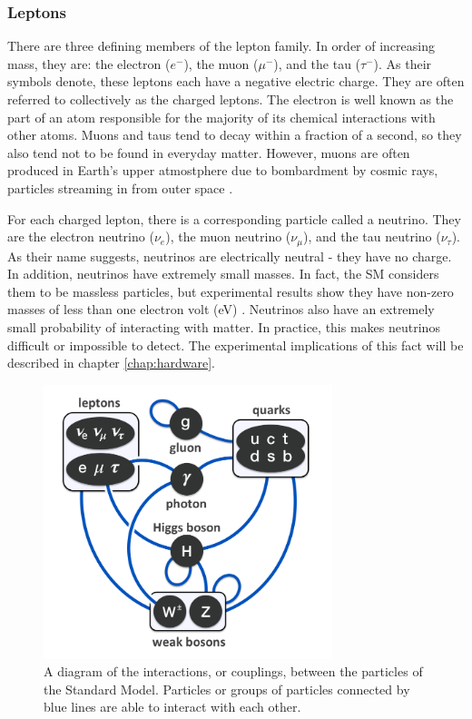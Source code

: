 \subsubsection*{Leptons}
There are three defining members of the lepton family. In order of
increasing mass, they are: the electron
($e^-$), the muon ($\mu^-$), and the tau ($\tau^-$). As their symbols
denote, these leptons each have a negative electric charge. They are
often referred to collectively as the charged leptons.
The electron is well known as the part of an atom responsible for the
majority of its chemical interactions with other atoms. Muons and taus
tend to decay within a fraction of a second, so they also tend not to
be found in everyday matter. However, muons are often produced in
Earth's upper atmostphere due to bombardment by cosmic rays, particles
streaming in from outer space \cite{griffiths}.

For each charged lepton, there is a corresponding particle called a
neutrino. They are the electron neutrino ($\nu_e$), the muon
neutrino ($\nu_{\mu}$), and the tau neutrino ($\nu_{\tau}$). As their
name suggests, neutrinos are electrically neutral - they have no
charge. In addition, neutrinos have extremely small masses. In fact,
the SM considers them to be massless particles, but experimental
results show they have non-zero masses of less than one electron volt
(eV) \cite{pdg}. Neutrinos also have an extremely small probability of
interacting with matter. In practice, this makes neutrinos
difficult or impossible to detect. The experimental implications of
this fact will be described in chapter \ref{chap:hardware}. %

\begin{figure}[h]
  \centering
  \includegraphics[width=0.75\textwidth]{figures/couplings.png}
  \caption{A diagram of the interactions, or couplings,
    between the particles of the Standard Model. Particles or groups
    of particles connected by blue lines are able to interact with
    each other.}
  \label{fig:couplings}
\end{figure}

